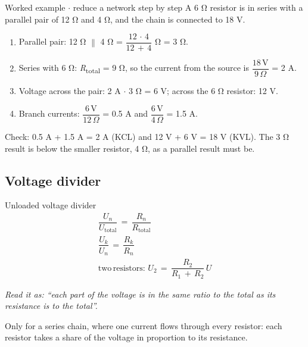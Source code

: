 \documentclass[11pt]{article}
\begin{document}
\begin{keepsection}
\begin{keepsection}
\begin{workedbox}{Worked example \ensuremath{\cdot} reduce a network step by step}
A 6 Ω resistor is in series with a parallel pair of 12 Ω and 4 Ω, and the chain is connected to 18 V.

\begin{enumerate}
\item Parallel pair: 12 Ω \ensuremath{\parallel} 4 Ω = {\small\ensuremath{\dfrac{12\, \cdot \, 4}{12\, +\, 4}}} Ω = 3 Ω.
\item Series with 6 Ω: \textit{R}\textsubscript{total} = 9 Ω, so the current from the source is {\small\ensuremath{\dfrac{18\, \mathrm{V}}{9\, Ω}}} = 2 A.
\item Voltage across the pair: 2 A \ensuremath{\cdot} 3 Ω = 6 V; across the 6 Ω resistor: 12 V.
\item Branch currents: {\small\ensuremath{\dfrac{6\, \mathrm{V}}{12\, Ω}}} = 0.5 A and {\small\ensuremath{\dfrac{6\, \mathrm{V}}{4\, Ω}}} = 1.5 A.
\end{enumerate}

Check: 0.5 A + 1.5 A = 2 A (KCL) and 12 V + 6 V = 18 V (KVL). The 3 Ω result is below the smaller resistor, 4 Ω, as a parallel result must be.
\end{workedbox}
\end{keepsection}

\begin{keepsection}
\subsection{Voltage divider}

\begin{equationcard}{Unloaded voltage divider}
\[ \begin{gathered} \dfrac{{U}_{{n}}}{{U}_{\text{total}}}\, =\, \dfrac{{R}_{{n}}}{{R}_{\text{total}}} \\ \dfrac{{U}_{{k}}}{{U}_{{n}}}\, =\, \dfrac{{R}_{{k}}}{{R}_{{n}}} \\ \text{two}\, \text{resistors}:\, {U}_{2}\, =\, \dfrac{{R}_{2}}{{R}_{1}\, +\, {R}_{2}}\, {U} \end{gathered} \]
{\small \emph{Read it as: “each part of the voltage is in the same ratio to the total as its resistance is to the total”.}\par Only for a series chain, where one current flows through every resistor: each resistor takes a share of the voltage in proportion to its resistance.}
\end{equationcard}


\end{keepsection}
\end{keepsection}
\end{document}

